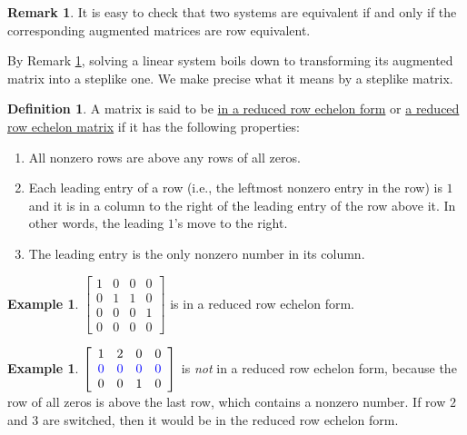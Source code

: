 \documentclass[12pt,letterpaper]{book}
\def\blue{\textcolor{blue}}
\numberwithin{equation}{section}
\theoremstyle{definition}
\newtheorem{defi}[thm]{\textbf{Definition}}
\newtheorem{example}[thm]{\textbf{Example}}
\newtheorem{remark}[thm]{\textbf{Remark}}
\begin{document}
\begin{remark}\label{system equals augmented} It is easy to check that two systems are equivalent if and only if the corresponding augmented matrices are row equivalent.
\end{remark}

By Remark \ref{system equals augmented}, solving a linear system boils down to transforming its augmented matrix into a steplike one. We make precise what it means by a steplike matrix.

\begin{defi}\label{rref} A matrix is said to be \ul{in a reduced row echelon form} or \ul{a reduced row echelon matrix} if it has the following properties:
\begin{enumerate}
\item All nonzero rows are above any rows of all zeros.
\item Each leading entry of a row (i.e., the leftmost nonzero entry in the row) is $1$ and it is in a column to the right of the leading entry of the row above it. In other words, the leading $1$'s move to the right.
\item The leading entry is the only nonzero number in its column.
\end{enumerate}
\end{defi}

\begin{example} $\left[\begin{array}{rrrr} 1 & 0 & 0 & 0
\\ 0 & 1 & 1 & 0 \\ 0 & 0 & 0 & 1 \\ 0 & 0 & 0 & 0
\end{array}\right]$ is in a reduced row echelon form.
\end{example}

\begin{example} $\left[\begin{array}{rrrr} 1 & 2 & 0 & 0
\\ \blue{0} & \blue{0} & \blue{0} & \blue{0} \\ 0 & 0 & 1 & 0 \end{array}\right]$ is \textit{not} in a reduced row echelon form, because the row of all zeros is above the last row, which contains a nonzero number. If row $2$ and $3$ are switched, then it would be in the reduced row echelon form.
\end{example}
\end{document}
